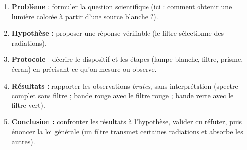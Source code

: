 \documentclass[11pt]{article}
\begin{document}
\begin{methode}
\begin{enumerate}
\item \textbf{Problème :} formuler la question scientifique (ici : comment obtenir une lumière colorée à partir d'une source blanche ?).
\item \textbf{Hypothèse :} proposer une réponse vérifiable (le filtre sélectionne des radiations).
\item \textbf{Protocole :} décrire le dispositif et les étapes (lampe blanche, filtre, prisme, écran) en précisant ce qu'on mesure ou observe.
\item \textbf{Résultats :} rapporter les observations \emph{brutes}, sans interprétation (spectre complet sans filtre ; bande rouge avec le filtre rouge ; bande verte avec le filtre vert).
\item \textbf{Conclusion :} confronter les résultats à l'hypothèse, valider ou réfuter, puis énoncer la loi générale (un filtre transmet certaines radiations et absorbe les autres).
\end{enumerate}
\end{methode}
\end{document}
